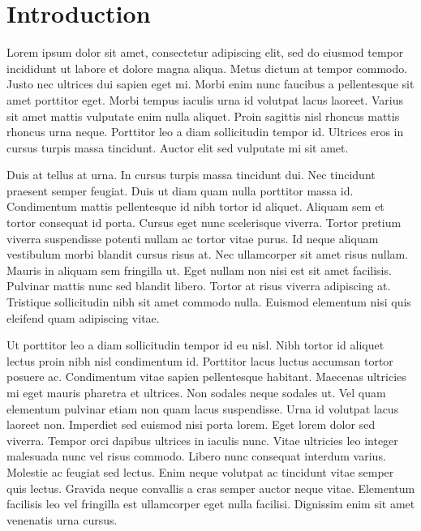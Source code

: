 \chapter{Introduction}
Lorem ipsum dolor sit amet, consectetur adipiscing elit, sed do eiusmod tempor incididunt ut labore et dolore magna aliqua. Metus dictum at tempor commodo. Justo nec ultrices dui sapien eget mi. Morbi enim nunc \cite{rouast-deeplearning} faucibus a pellentesque sit amet porttitor eget. Morbi tempus iaculis urna id volutpat lacus laoreet. Varius sit amet mattis vulputate enim nulla aliquet. Proin sagittis nisl rhoncus mattis rhoncus urna neque. Porttitor leo a diam sollicitudin tempor id. Ultrices eros in cursus turpis massa tincidunt. Auctor elit sed vulputate mi sit amet.

Duis at tellus at urna. In cursus turpis massa tincidunt dui. Nec tincidunt praesent semper feugiat. Duis ut diam quam nulla porttitor massa id. Condimentum mattis pellentesque id nibh tortor id aliquet. Aliquam sem et tortor consequat id porta. Cursus eget nunc scelerisque viverra. Tortor pretium viverra suspendisse potenti nullam ac tortor vitae purus. Id neque aliquam vestibulum morbi blandit cursus risus at. Nec ullamcorper sit amet risus nullam. Mauris in aliquam sem fringilla ut. Eget nullam non nisi est sit amet facilisis. Pulvinar mattis nunc sed blandit libero. Tortor at risus viverra adipiscing at. Tristique sollicitudin nibh sit amet commodo nulla. Euismod elementum nisi quis eleifend quam adipiscing vitae.

Ut porttitor leo a diam sollicitudin tempor id eu nisl. Nibh tortor id aliquet lectus proin nibh nisl condimentum id. Porttitor lacus luctus accumsan tortor posuere ac. Condimentum vitae sapien pellentesque habitant. Maecenas ultricies mi eget mauris pharetra et ultrices. Non sodales neque sodales ut. Vel quam elementum pulvinar etiam non quam lacus suspendisse. Urna id volutpat lacus laoreet non. Imperdiet sed euismod nisi porta lorem. Eget lorem dolor sed viverra. Tempor orci dapibus ultrices in iaculis nunc. Vitae ultricies leo integer malesuada nunc vel risus commodo. Libero nunc consequat interdum varius. Molestie ac feugiat sed lectus. Enim neque volutpat ac tincidunt vitae semper quis lectus. Gravida neque convallis a cras semper auctor neque vitae. Elementum facilisis leo vel fringilla est ullamcorper eget nulla facilisi. Dignissim enim sit amet venenatis urna cursus.

